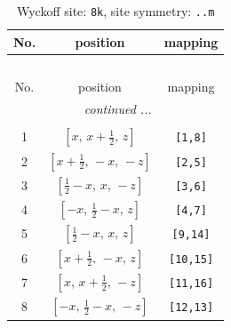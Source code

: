 \documentclass[fleqn,8pt]{jsarticle}
\begin{document}
\begin{longtable}{ccc}
\caption{Wyckoff site: {\tt 8k}, site symmetry: {\tt ..m}}
 \\
 \hline \hline
No. & position & mapping \\ \hline \endfirsthead

\multicolumn{2}{l}{\tablename\ \thetable{}} \\
 \hline \hline
No. & position & mapping \\ \hline \endhead

 \hline \hline
\multicolumn{2}{r}{\footnotesize\it continued ...} \\ \endfoot

 \hline \hline
\multicolumn{2}{r}{} \\ \endlastfoot

1 & $\left[ x,\, x + \frac{1}{2},\, z \right]$ & {\tt [1,8]} \\ \hline
2 & $\left[ x + \frac{1}{2},\, - x,\, - z \right]$ & {\tt [2,5]} \\ \hline
3 & $\left[ \frac{1}{2} - x,\, x,\, - z \right]$ & {\tt [3,6]} \\ \hline
4 & $\left[ - x,\, \frac{1}{2} - x,\, z \right]$ & {\tt [4,7]} \\ \hline
5 & $\left[ \frac{1}{2} - x,\, x,\, z \right]$ & {\tt [9,14]} \\ \hline
6 & $\left[ x + \frac{1}{2},\, - x,\, z \right]$ & {\tt [10,15]} \\ \hline
7 & $\left[ x,\, x + \frac{1}{2},\, - z \right]$ & {\tt [11,16]} \\ \hline
8 & $\left[ - x,\, \frac{1}{2} - x,\, - z \right]$ & {\tt [12,13]} \\
\end{longtable}
\renewcommand{\arraystretch}{1.2}
\end{document}
